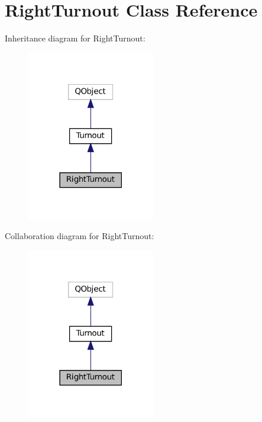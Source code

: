 \hypertarget{classRightTurnout}{}\section{Right\+Turnout Class Reference}
\label{classRightTurnout}


Inheritance diagram for Right\+Turnout\+:
\nopagebreak
\begin{figure}[H]
\begin{center}
\leavevmode
\includegraphics[width=158pt]{classRightTurnout__inherit__graph}
\end{center}
\end{figure}


Collaboration diagram for Right\+Turnout\+:
\nopagebreak
\begin{figure}[H]
\begin{center}
\leavevmode
\includegraphics[width=158pt]{classRightTurnout__coll__graph}
\end{center}
\end{figure}
